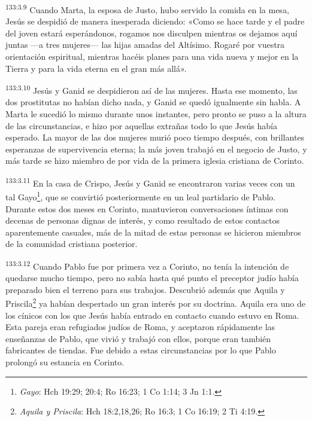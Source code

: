 \par
\textsuperscript{133:3.9} Cuando Marta, la esposa de Justo, hubo servido la comida en la mesa, Jesús se despidió de manera inesperada diciendo: «Como se hace tarde y el padre del joven estará esperándonos, rogamos nos disculpen mientras os dejamos aquí juntas ---a tres mujeres--- las hijas amadas del Altísimo. Rogaré por vuestra orientación espiritual, mientras hacéis planes para una vida nueva y mejor en la Tierra y para la vida eterna en el gran más allá».

\par
\textsuperscript{133:3.10} Jesús y Ganid se despidieron así de las mujeres. Hasta ese momento, las dos prostitutas no habían dicho nada, y Ganid se quedó igualmente sin habla. A Marta le sucedió lo mismo durante unos instantes, pero pronto se puso a la altura de las circunstancias, e hizo por aquellas extrañas todo lo que Jesús había esperado. La mayor de las dos mujeres murió poco tiempo después, con brillantes esperanzas de supervivencia eterna; la más joven trabajó en el negocio de Justo, y más tarde se hizo miembro de por vida de la primera iglesia cristiana de Corinto.

\par
\textsuperscript{133:3.11} En la casa de Crispo, Jesús y Ganid se encontraron varias veces con un tal Gayo\footnote{\textit{Gayo}: Hch 19:29; 20:4; Ro 16:23; 1 Co 1:14; 3 Jn 1:1.}, que se convirtió posteriormente en un leal partidario de Pablo. Durante estos dos meses en Corinto, mantuvieron conversaciones íntimas con decenas de personas dignas de interés, y como resultado de estos contactos aparentemente casuales, más de la mitad de estas personas se hicieron miembros de la comunidad cristiana posterior.

\par
\textsuperscript{133:3.12} Cuando Pablo fue por primera vez a Corinto, no tenía la intención de quedarse mucho tiempo, pero no sabía hasta qué punto el preceptor judío había preparado bien el terreno para sus trabajos. Descubrió además que Aquila y Priscila\footnote{\textit{Aquila y Priscila}: Hch 18:2,18,26; Ro 16:3; 1 Co 16:19; 2 Ti 4:19.} ya habían despertado un gran interés por su doctrina. Aquila era uno de los cínicos con los que Jesús había entrado en contacto cuando estuvo en Roma. Esta pareja eran refugiados judíos de Roma, y aceptaron rápidamente las enseñanzas de Pablo, que vivió y trabajó con ellos, porque eran también fabricantes de tiendas. Fue debido a estas circunstancias por lo que Pablo prolongó su estancia en Corinto.

